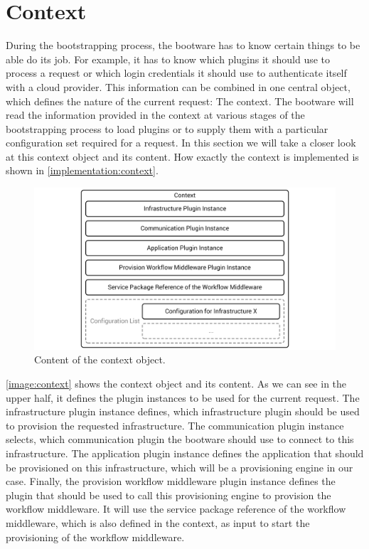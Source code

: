 \section{Context}
\label{design:context}

During the bootstrapping process, the bootware has to know certain things to be able do its job.
For example, it has to know which plugins it should use to process a request or which login credentials it should use to authenticate itself with a cloud provider.
This information can be combined in one central object, which defines the nature of the current request: The context.
The bootware will read the information provided in the context at various stages of the bootstrapping process to load plugins or to supply them with a particular configuration set required for a request.
In this section we will take a closer look at this context object and its content.
How exactly the context is implemented is shown in \autoref{implementation:context}.

\begin{figure}[!htbp]
	\centering
	\includegraphics[resolution=600]{design/assets/context}
	\caption{Content of the context object.}
	\label{image:context}
\end{figure}

\autoref{image:context} shows the context object and its content.
As we can see in the upper half, it defines the plugin instances to be used for the current request.
The infrastructure plugin instance defines, which infrastructure plugin should be used to provision the requested infrastructure.
The communication plugin instance selects, which communication plugin the bootware should use to connect to this infrastructure.
The application plugin instance defines the application that should be provisioned on this infrastructure, which will be a provisioning engine in our case.
Finally, the provision workflow middleware plugin instance defines the plugin that should be used to call this provisioning engine to provision the workflow middleware.
It will use the service package reference of the workflow middleware, which is also defined in the context, as input to start the provisioning of the workflow middleware.

